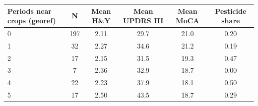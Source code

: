 \begin{tabular}{lccccc}
\hline\hline
Periods near crops (georef) & N & Mean H\&Y & Mean UPDRS III & Mean MoCA & Pesticide share \\
\hline
0 & 197 & 2.11 & 29.7 & 21.0 & 0.20 \\
1 & 32 & 2.27 & 34.6 & 21.2 & 0.19 \\
2 & 17 & 2.15 & 31.5 & 19.3 & 0.47 \\
3 & 7 & 2.36 & 32.9 & 18.7 & 0.00 \\
4 & 22 & 2.23 & 37.9 & 18.1 & 0.50 \\
5 & 17 & 2.50 & 43.5 & 18.7 & 0.29 \\
\hline\hline
\end{tabular}
